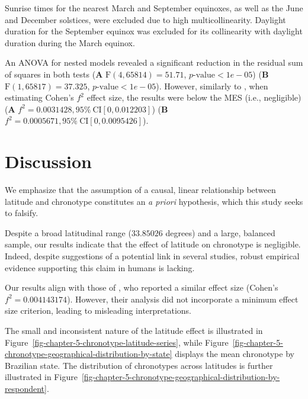 \documentclass[
12pt,
openright,
oneside,
a4paper,
chapter=TITLE,
section=TITLE,
french,
spanish,
brazil,
english
]{abntex2}
\begin{document}
Sunrise times for the nearest March and September equinoxes, as well as
the June and December solstices, were excluded due to high
multicollinearity. Daylight duration for the September equinox was
excluded for its collinearity with daylight duration during the March
equinox.

An ANOVA for nested models revealed a significant reduction in the
residual sum of squares in both tests (\textbf{A}
\(\text{F}(4, 65814) = 51.71\), \(p\text{-value} < 1e-05\)) (\textbf{B}
\(\text{F}(1, 65817) = 37.325\), \(p\text{-value} < 1e-05\)). However,
similarly to \textcite{leocadio-miguel2017}, when estimating Cohen's
\(f^2\) effect size, the results were below the MES (i.e., negligible)
(\textbf{A} \(f^2 = 0.0031428, 95\% \ \text{CI}[0, 0.012203]\))
(\textbf{B} \(f^2 = 0.0005671, 95\% \ \text{CI}[0, 0.0095426]\)).

\section{Discussion}\label{discussion}

We emphasize that the assumption of a causal, linear relationship
between latitude and chronotype constitutes an \emph{a priori}
hypothesis, which this study seeks to falsify.

Despite a broad latitudinal range (\(33.85026\) degrees) and a large,
balanced sample, our results indicate that the effect of latitude on
chronotype is negligible. Indeed, despite suggestions of a potential
link in several studies, robust empirical evidence supporting this claim
in humans is lacking.

Our results align with those of \textcite{leocadio-miguel2017}, who
reported a similar effect size (Cohen's \(f^2 = 0.004143174\)). However,
their analysis did not incorporate a minimum effect size criterion,
leading to misleading interpretations.

The small and inconsistent nature of the latitude effect is illustrated
in Figure~\ref{fig-chapter-5-chronotype-latitude-series}, while
Figure~\ref{fig-chapter-5-chronotype-geographical-distribution-by-state}
displays the mean chronotype by Brazilian state. The distribution of
chronotypes across latitudes is further illustrated in
Figure~\ref{fig-chapter-5-chronotype-geographical-distribution-by-respondent}.
\end{document}
